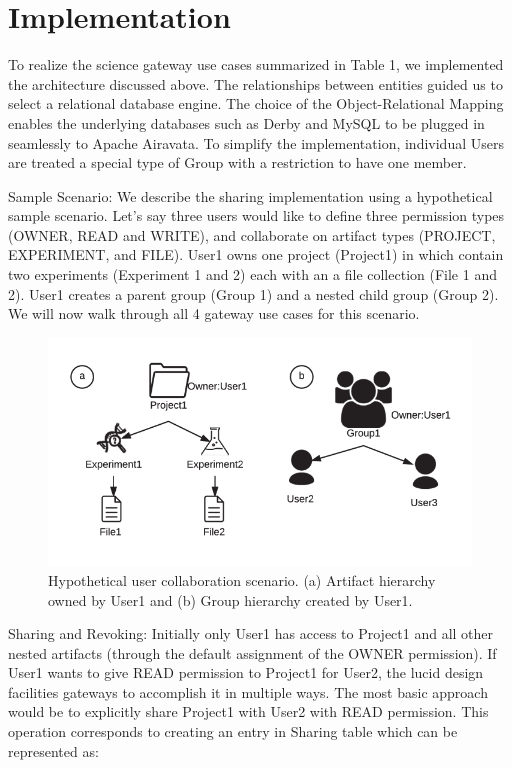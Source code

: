 \documentclass[sigconf]{acmart}
\begin{document}
\section{Implementation}
To realize the science gateway use cases summarized in Table 1, we implemented the architecture discussed above. The relationships between entities guided us to select a relational database engine. The choice of the Object-Relational Mapping enables the underlying databases such as Derby and MySQL to be plugged in seamlessly to Apache Airavata. To simplify the implementation, individual Users are treated a special type of Group with a restriction to have one member. 

Sample Scenario: We describe the sharing implementation using a hypothetical sample scenario. Let's say three users would like to define three permission types (OWNER, READ and WRITE), and collaborate on artifact types (PROJECT, EXPERIMENT, and FILE). User1 owns one project (Project1) in which contain two experiments (Experiment 1 and 2) each with an a file collection (File 1 and 2). User1 creates a parent group (Group 1) and a nested child group (Group 2). We will now walk through all 4 gateway use cases for this scenario.

\begin{figure}
\includegraphics[width=\columnwidth]{figures/usage-scenarios.pdf}
\caption{Hypothetical user collaboration scenario. (a) Artifact hierarchy owned by User1 and (b) Group hierarchy created by User1.}
\end{figure}

Sharing and Revoking: Initially only User1 has access to Project1 and all other nested artifacts (through the default assignment of the OWNER permission). If User1 wants to give READ permission to Project1 for User2, the lucid design facilities gateways to accomplish it in multiple ways. The most basic approach would be to explicitly share Project1 with User2 with READ permission. This operation corresponds to creating an entry in Sharing table which can be represented as: 
\end{document}
